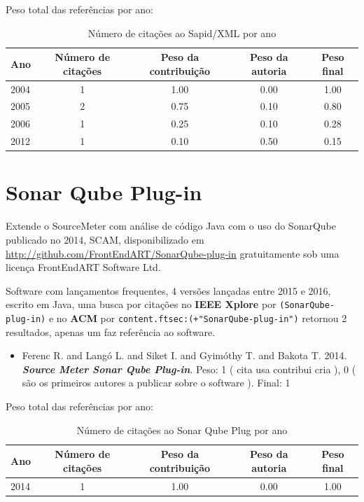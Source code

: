 Peso total das referências por ano:

\begin{table}[h]
\caption{Número de citações ao Sapid/XML por ano}
\centering
\begin{tabular}{| l | c | c | c | c |}
  \hline
  Ano & Número de citações & Peso da contribuição & Peso da autoria & Peso final \\
  \hline
  2004
    & 1
    & 1.00
    & 0.00
    & 1.00 \\
  2005
    & 2
    & 0.75
    & 0.10
    & 0.80 \\
  2006
    & 1
    & 0.25
    & 0.10
    & 0.28 \\
  2012
    & 1
    & 0.10
    & 0.50
    & 0.15 \\
  \hline
\end{tabular}
\end{table}


\section{Sonar Qube Plug-in}

Extende o SourceMeter com análise de código Java com o uso do SonarQube
publicado no 2014, SCAM,
disponibilizado em \url{http://github.com/FrontEndART/SonarQube-plug-in}
gratuitamente
sob uma licença FrontEndART Software Ltd.

Software com lançamentos frequentes,
4 versões lançadas
entre 2015 e 2016,
escrito em Java,
uma busca por citações no {\bf IEEE Xplore} por
\texttt{(SonarQube-plug-in)}
e no {\bf ACM} por
\texttt{content.ftsec:(+"SonarQube-plug-in")}
retornou
2 resultados,
apenas um faz referência ao software.

\begin{itemize}
\item Ferenc R. and Langó L. and Siket I. and Gyimóthy T. and Bakota T.
      2014.
        \textbf{\textit{ Source Meter Sonar Qube Plug-in}}.
      Peso:
      1 (
          cita
          usa
          contribui
          cria
      ),
      0 (
são os primeiros autores a publicar sobre o software
      ).
      Final:
      1

\end{itemize}

Peso total das referências por ano:

\begin{table}[h]
\caption{Número de citações ao Sonar Qube Plug por ano}
\centering
\begin{tabular}{| l | c | c | c | c |}
  \hline
  Ano & Número de citações & Peso da contribuição & Peso da autoria & Peso final \\
  \hline
  2014
    & 1
    & 1.00
    & 0.00
    & 1.00 \\
  \hline
\end{tabular}
\end{table}


